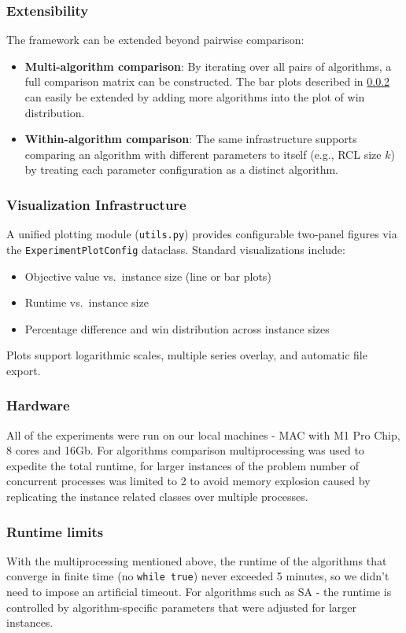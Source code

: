 \documentclass[a4paper]{scrartcl}
\begin{document}
\subsubsection{Extensibility}
The framework can be extended beyond pairwise comparison:
\begin{itemize}
  \item \textbf{Multi-algorithm comparison}: By iterating over all pairs of algorithms, a full comparison matrix can be constructed. The bar plots described in  \ref{experiment_visualization} can easily be extended by adding more algorithms into the plot of win distribution.
  \item \textbf{Within-algorithm comparison}: The same infrastructure supports comparing an algorithm with different parameters to itself (e.g., RCL size $k$) by treating each parameter configuration as a distinct algorithm.
\end{itemize}

\subsubsection{Visualization Infrastructure}\label{experiment_visualization}
A unified plotting module (\texttt{utils.py}) provides configurable two-panel figures via the \texttt{ExperimentPlotConfig} dataclass.
Standard visualizations include:
\begin{itemize}
  \item Objective value vs.\ instance size (line or bar plots)
  \item Runtime vs.\ instance size
  \item Percentage difference and win distribution across instance sizes
\end{itemize}
Plots support logarithmic scales, multiple series overlay, and automatic file export.

\subsubsection{Hardware}
All of the experiments were run on our local machines - MAC with M1 Pro Chip, 8 cores and 16Gb. For algorithms comparison multiprocessing was used to expedite the total runtime, for larger instances of the problem number of concurrent processes was limited to 2 to avoid memory explosion caused by replicating the instance related classes over multiple processes.  

\subsubsection{Runtime limits}
With the multiprocessing mentioned above, the runtime of the algorithms that converge in finite time (no \texttt{while true}) never exceeded 5 minutes, so we didn't need to impose an artificial timeout. For algorithms such as SA - the runtime is controlled by algorithm-specific parameters that were adjusted for larger instances.
\end{document}
